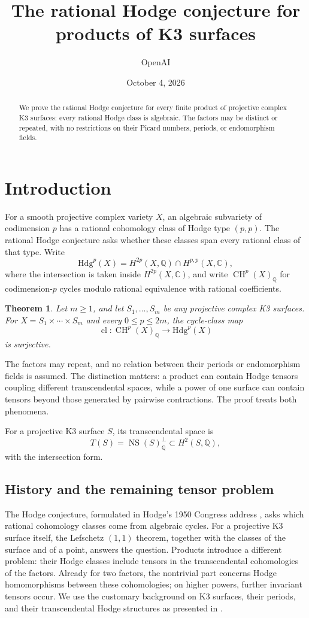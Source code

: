 \documentclass[11pt]{article}
\title{The rational Hodge conjecture for products of K3 surfaces}
\author{OpenAI}
\date{October 4, 2026}
\numberwithin{equation}{section}
\newtheorem{theorem}{Theorem}[section]
\theoremstyle{definition}
\theoremstyle{remark}
\begin{document}
\begin{abstract}
We prove the rational Hodge conjecture for every finite product of projective
complex K3 surfaces: every rational Hodge class is algebraic.  The factors
may be distinct or repeated, with no restrictions on their Picard numbers,
periods, or endomorphism fields.
\end{abstract}
\tableofcontents

\section{Introduction}\label{sec:introduction}

For a smooth projective complex variety \(X\), an algebraic subvariety
of codimension \(p\) has a rational cohomology class of Hodge type
\((p,p)\).  The rational Hodge conjecture asks whether these classes
span every rational class of that type.  Write
\[
 \mathrm{Hdg}^p(X)=H^{2p}(X,\mathbb Q)\cap H^{p,p}(X,\mathbb C),
\]
where the intersection is taken inside \(H^{2p}(X,\mathbb C)\), and write
\(\operatorname{CH}^p(X)_\mathbb Q\) for codimension-\(p\) cycles modulo rational
equivalence with rational coefficients.

\begin{theorem}\label{thm:main}
Let \(m\ge1\), and let \(S_1,\ldots,S_m\) be any projective complex
K3 surfaces.  For \(X=S_1\times\cdots\times S_m\) and every
\(0\le p\le2m\), the cycle-class map
\[
 \operatorname{cl}:\operatorname{CH}^p(X)_\mathbb Q\longrightarrow\mathrm{Hdg}^p(X)
\]
is surjective.
\end{theorem}

The factors may repeat, and no relation between their periods or
endomorphism fields is assumed.  The distinction matters: a product
can contain Hodge tensors coupling different transcendental spaces,
while a power of one surface can contain tensors beyond those generated
by pairwise contractions.  The proof treats both phenomena.

For a projective K3 surface \(S\), its transcendental space is
\[
 T(S)=\operatorname{NS}(S)_\mathbb Q^\perp\subset H^2(S,\mathbb Q),
\]
with the intersection form.  

\subsection{History and the remaining tensor problem}
The Hodge conjecture, formulated in Hodge's 1950 Congress address
\cite{Hodge1952}, asks which rational cohomology classes come from algebraic
cycles.  For a projective K3 surface itself, the Lefschetz $(1,1)$ theorem,
together with the classes of the surface and of a point, answers the question.
Products introduce a different problem: their Hodge classes include tensors
in the transcendental cohomologies of the factors.  Already for two factors,
the nontrivial part concerns Hodge homomorphisms between these cohomologies;
on higher powers, further invariant tensors occur.  We use the customary
background on K3 surfaces, their periods, and their transcendental Hodge
structures as presented in \cite{HuybrechtsK3}.
\end{document}
